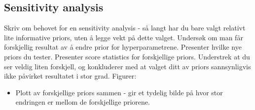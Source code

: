 \subsection{Sensitivity analysis}
\textcolor{myDarkGreen}{Skriv om behovet for en sensitivity analysis - så langt har du bare valgt relativt lite informative priors, uten å legge vekt på dette valget. Undersøk om man får forskjellig resultat av å endre prior for hyperparametrene. Presenter hvilke nye priors du tester. Presenter score statistics for forskjellige priors. 
Understrek at du ser veldig liten forskjell, og konkluderer med at valget ditt av priors sannsynligvis ikke påvirket resultatet i stor grad. 
\newline
Figurer:
\begin{itemize}
    \item Plott av forskjellige priors sammen - gir et tydelig bilde på hvor stor endringen er mellom de forskjellige priorene. 
\end{itemize}}

